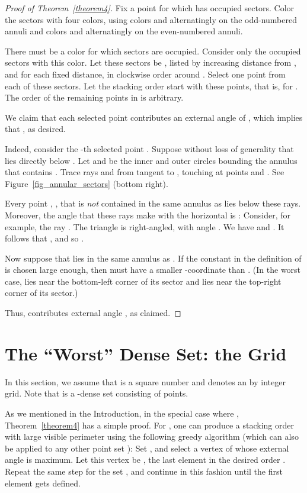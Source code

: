 \documentclass[11pt]{article}
\begin{document}
\begin{proof}[Proof of Theorem~\ref{theorem4}] Fix a point  for which
 has  occupied sectors. Color the sectors with
four colors, using colors  and  alternatingly on the
odd-numbered annuli and colors  and  alternatingly on the
even-numbered annuli.

There must be a color for which  sectors are
occupied. Consider only the occupied sectors with this color.
Let these sectors be , listed by
increasing distance from , and for each fixed distance, in
clockwise order around . Select one point 
from each of these sectors. Let the stacking order  start with these
points, that is,  for . The order of the
remaining points in  is arbitrary.

We claim that each selected point  contributes an external
angle of , which implies that , as desired.

Indeed, consider the -th selected point . Suppose
without loss of generality that  lies directly below .
Let  and  be the inner and outer circles bounding
the annulus that contains . Trace rays  and 
from  tangent to , touching  at points
 and . See Figure~\ref{fig_annular_sectors} (bottom right).

Every point , , that is \emph{not} contained in the
same annulus as  lies below these rays. Moreover, the
angle  that these rays make with the horizontal is
: Consider, for example, the ray . The
triangle  is right-angled, with angle . We have  and . It follows that , and so .

Now suppose that  lies in the same annulus as .
If the constant  in the definition of  is chosen
large enough, then  must have a smaller -coordinate
than . (In the worst case,  lies near the bottom-left
corner of its sector and  lies near the top-right
corner of its sector.)

Thus,  contributes external angle , as claimed.
\end{proof}

\section{The ``Worst'' Dense Set: the Grid}

In this section, we assume that  is a square number and  denotes an  by  integer grid. Note that  is a -dense set consisting of  points.

As we mentioned in the Introduction, in the special case where , Theorem~\ref{theorem4} has a simple proof. For , one can produce a stacking order with large visible perimeter using the following greedy algorithm (which can also be applied to any other point set ): Set , and select a vertex of  whose external angle is maximum. Let this vertex be , the last element in the desired order . Repeat the same step for the set , and continue in this fashion until the first element  gets defined.
\end{document}

